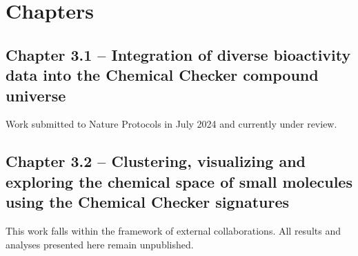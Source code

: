 
\chapter{Chapters}
\newpage


\section[Integration of diverse bioactivity data into the Chemical Checker compound universe]{Chapter 3.1 -- Integration of diverse bioactivity data into the Chemical Checker compound universe}
\label{Chapter_3.1}
\setcounter{figure}{0}
\renewcommand{\thefigure}{3.\arabic{section}.\arabic{figure}}
Work submitted to Nature Protocols in July 2024 and currently under review.







\newpage



\section[Clustering, visualizing and exploring the chemical space of small molecules using the Chemical Checker signatures]{Chapter 3.2 -- Clustering, visualizing and exploring the chemical space of small molecules using the Chemical Checker signatures}
\label{Chapter_3.2}
\setcounter{figure}{0}
\renewcommand{\thefigure}{3.\arabic{section}.\arabic{figure}}
This work falls within the framework of external collaborations. All results and analyses presented here remain unpublished. 

